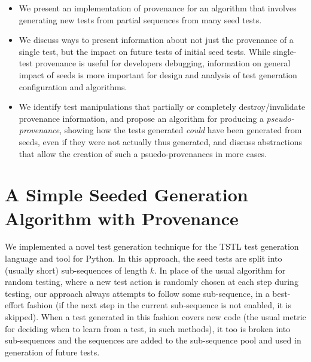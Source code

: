 \documentclass[final]{article}
\begin{document}
\begin{itemize}
\item We present an implementation of provenance for an algorithm that involves
  generating new tests from partial sequences from many seed tests.
\item We discuss ways to present information about not just the
  provenance of a single test, but the impact on future tests of
  initial seed tests.  While single-test provenance is useful for
  developers debugging, information on general impact of seeds is more
  important for design and analysis of test generation configuration
  and algorithms.
\item We identify test manipulations that partially or completely
  destroy/invalidate provenance information, and propose an algorithm
  for producing a \emph{pseudo-provenance}, showing how the tests generated
  \emph{could} have been generated from seeds, even if they were not actually
  thus generated, and discuss abstractions that allow the
  creation of such a psuedo-provenances in more cases.
\end{itemize}

\section{A Simple Seeded Generation Algorithm with Provenance}

We implemented a novel test generation technique for the TSTL
\cite{tstlsttt,nfm15,issta15,tstl} test generation language and tool for
Python.  In this approach, the seed tests are split into (usually short)
sub-sequences of length $k$.  In place of the usual algorithm for
random testing, where a new test action is randomly chosen at each
step during testing, our approach always attempts to follow some
sub-sequence, in a best-effort fashion (if the next step in the
current sub-sequence is not enabled, it is skipped).  When a test
generated in this fashion covers new code (the usual metric for
deciding when to learn from a test, in such methods), it too is broken into sub-sequences
and the sequences are added to the sub-sequence pool and used in generation of
future tests.
\end{document}
